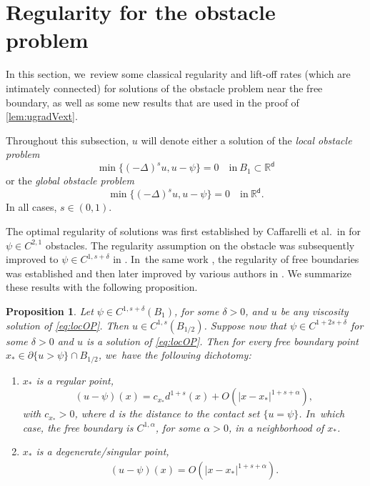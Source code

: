 \documentclass[JEP,XML,SOM,Unicode,published]{cedram}
\newenvironment{enumeratei}
{\bgroup\def\theenumi{\roman{enumi}}\def\theenumii{\arabic{enumii}}\begin{enumerate}}
{\end{enumerate}\egroup}
\theoremstyle{plain}
\newtheorem{prop}[thm]{Proposition}
\theoremstyle{definition}
\newcommand{\R}{{\mathbb{R}}}
\let\al\alpha
\let\p\partial
\renewcommand{\d}{\mathsf{d}}
\begin{document}
\section{Regularity for the obstacle problem}\label{sec:appOP}
In this section, we~review some classical regularity {and lift-off rates (which are intimately connected)} for solutions of the obstacle problem near the free boundary, as well as some new results that are used in the proof of \cref{lem:ugradVext}.

Throughout this subsection, $u$ will denote either a solution of the \emph{local obstacle problem}
\begin{equation}\label{eq:locOP}
\min\{(-\Delta)^s u, u-\psi\} = 0 \quad \text{in} \ B_1\subset\R^\d
\end{equation}
or the \emph{global obstacle problem}
\begin{equation}\label{eq:globOP}
\min\{(-\Delta)^s u, u-\psi\} = 0 \quad \text{in} \ \R^\d.
\end{equation}
In all cases, $s\in (0,1)$.

The optimal regularity of solutions was first established by Caffarelli et al.\ in \cite{CSS2008} for $\psi\in C^{2,1}$ obstacles. The regularity assumption on the obstacle was subsequently improved to $\psi\in C^{1,s+\delta}$ in \cite{CdSS2017}. In~the same work \cite{CSS2008}, the regularity of free boundaries was established and then later improved by various authors in \cite{CdSS2017,rOS2017}. We summarize these results with the following proposition.

\begin{prop}\label{prop:OPreg}
Let $\psi \in C^{1,s+\delta}(B_1)$, for some $\delta>0$, and $u$ be any viscosity solution of \eqref{eq:locOP}. Then $u\in C^{1,s}(B_{1/2})$.
Suppose now that $\psi \in C^{1+2s+\delta}$ for some $\delta>0$ and $u$ is a solution of \eqref{eq:locOP}. Then for every free boundary point $x_*\in \p\{u>\psi\} \cap B_{1/2}$, we~have the following dichotomy:
\begin{enumeratei}
\item\label{item:regpt} $x_*$ is a \emph{regular point},
\begin{equation}\label{eq:regptasy}
(u-\psi)(x) = c_{x_*}d^{1+s}(x) + O(|x-x_*|^{1+s+\al}),
\end{equation}
with $c_{x_*}>0$, where $d$ is the distance to the contact set $\{u=\psi\}$. In~which case, the free boundary is $C^{1,\al}${, for some $\al>0$,} in a neighborhood of $x_*$.
\item\label{item:singpt} $x_*$ is a \emph{degenerate/singular point},
\begin{align*}
(u-\psi)(x) = O(|x-x_*|^{1+s+\al}).
\end{align*}
\end{enumeratei}
\end{prop}
\end{document}
